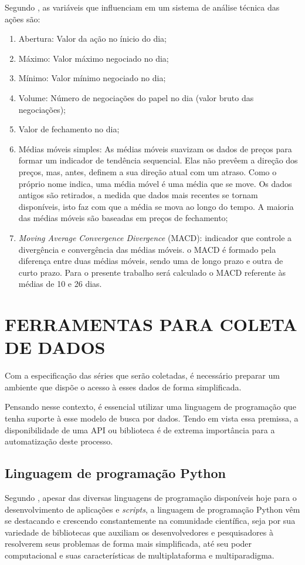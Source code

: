 Segundo , as variáveis que influenciam em um sistema de análise técnica das ações são:

\begin{enumerate}
\item Abertura: Valor da ação no ínicio do dia;
\item Máximo: Valor máximo negociado no dia;
\item Mínimo: Valor mínimo negociado no dia;
\item Volume: Número de negociações do papel no dia (valor bruto das negociações);
\item Valor de fechamento no dia;
\item Médias móveis simples: As médias móveis suavizam os dados de preços para formar um indicador de tendência sequencial. Elas não prevêem a direção dos preços, mas, antes, definem a sua direção atual com um atraso. Como o próprio nome indica, uma média móvel é uma média que se move. Os dados antigos são retirados, a medida que dados mais recentes se tornam disponíveis, isto faz com que a média se mova ao longo do tempo. A maioria das médias móveis são baseadas em preços de fechamento;
\item \textit{Moving Average Convergence Divergence} (MACD): indicador que controle a divergência e convergência das médias móveis. o MACD é formado pela diferença entre duas médias móveis, sendo uma de longo prazo e outra de curto prazo. Para o presente trabalho será calculado o MACD referente às médias de 10 e 26 dias.
\end{enumerate}

\section{FERRAMENTAS PARA COLETA DE DADOS}
Com a especificação das séries que serão coletadas, é necessário preparar um ambiente que dispõe o acesso à esses dados de forma simplificada. 

Pensando nesse contexto, é essencial utilizar uma linguagem de programação que tenha suporte à esse modelo de busca por dados. Tendo em vista essa premissa, a disponibilidade de uma API ou biblioteca é de extrema importância para a automatização deste processo.

\subsection{Linguagem de programação Python}
Segundo , apesar das diversas linguagens de programação disponíveis hoje para o desenvolvimento de aplicações e \textit{scripts}, a linguagem de programação Python vêm se destacando e crescendo constantemente na comunidade científica, seja por sua variedade de bibliotecas que auxiliam os desenvolvedores e pesquisadores à resolverem seus problemas de forma mais simplificada, até seu poder computacional e suas características de multiplataforma e multiparadigma.

